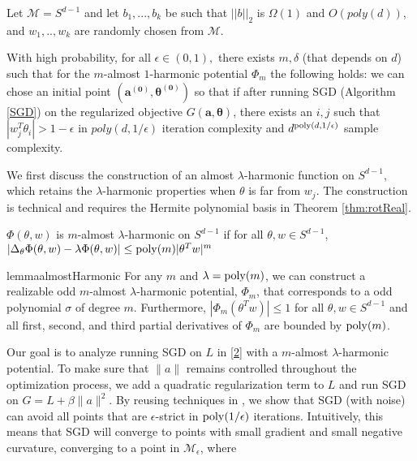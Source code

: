 \begin{theorem}\label{eigSGD}
  Let $\mathcal{M} = S^{d-1}$ and let $b_1,...,b_k$ be such that
$||b||_2$ is $\Omega(1)$ and $O(poly(d))$, and $w_1,..,w_k$ are
  randomly chosen from $\mathcal{M}$.  

  
  With high probability, for all $\epsilon \in (0,1),$ there exists $m, \delta$ (that depends on $d$) such that for the $m$-almost $1$-harmonic potential $\Phi_m$ the
  following holds: we can chose an initial point $(\boldsymbol{a^{(0)}, \theta^{(0)}})$ so that if after running SGD (Algorithm \ref{SGD}) on the regularized objective
  $G(\boldsymbol{a,\theta})$, there exists an $i, j$ such that $|w_j^T\theta_i| > 1- \epsilon$ in $poly(d,1/\epsilon)$ iteration complexity and $d^{\mathrm{poly}(d, 1/\epsilon)}$ sample complexity.
\end{theorem}
%
%
We first discuss the construction of an almost $\lambda$-harmonic function on $S^{d-1}$, which retains the $\lambda$-harmonic properties when $\theta$ is far from $w_j$. The construction is technical and requires the Hermite polynomial basis in Theorem \ref{thm:rotReal}.
%
%
\begin{definition}
$\Phi(\theta, w)$ is $m$-almost $\lambda$-harmonic on $S^{d-1}$ if for
all $\theta, w\in S^{d-1}$, $|\Delta_{\theta}\Phi(\theta, w) - \lambda \Phi (\theta,w)| \leq \mathrm{poly}(m)|\theta^Tw|^m$ 
\end{definition}
%
%
\begin{restatable}{lemma}{almostHarmonic}\label{AlmostHarmonic}
For any $m$ and $\lambda = \mathrm{poly}(m)$,  we can construct a realizable odd $m$-almost $\lambda$-harmonic potential, $\Phi_m$, that corresponds to a odd polynomial $\sigma$ of degree $m$. Furthermore, $|\Phi_m(\theta^Tw)|\leq 1$ for all $\theta, w \in S^{d-1}$ and all first, second, and third partial derivatives of $\Phi_m$ are bounded by $\mathrm{poly}(m)$.
\end{restatable} 
%
%
%
Our goal is to analyze running SGD on $L$ in \eqref{2} with a $m$-almost $\lambda$-harmonic potential. To make sure that $\|a\|$ remains controlled throughout the optimization process, we add a quadratic regularization term to $L$ and run SGD on $G = L + \beta \|a\|^2$. By reusing techniques in \cite{GeHJY15}, we show that SGD (with noise) can avoid all points that are $\epsilon$-strict in $\mathrm{poly}(1/\epsilon)$ iterations. Intuitively, this means that SGD will converge to points with small gradient and small negative curvature, converging to a point in $\mathcal{M}_\epsilon$, where 
